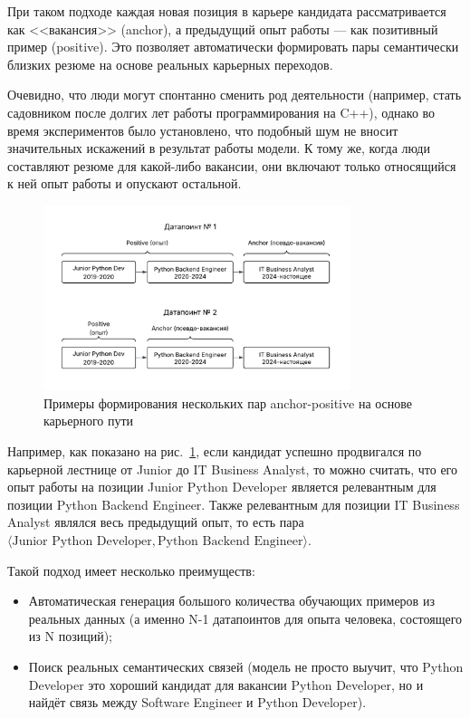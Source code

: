 \documentclass[14pt]{mmcs_article}
\begin{document}
При таком подходе каждая новая позиция в карьере кандидата рассматривается как <<вакансия>> (anchor), а предыдущий опыт работы --- как позитивный пример (positive). Это позволяет автоматически формировать пары семантически близких резюме на основе реальных карьерных переходов.

Очевидно, что люди могут спонтанно сменить род деятельности (например, стать садовником после долгих лет работы программирования на C++), однако во время экспериментов было установлено, что подобный шум не вносит значительных искажений в результат работы модели. К тому же, когда люди составляют резюме для какой-либо вакансии, они включают только относящийся к ней опыт работы и опускают остальной.

\begin{figure}[h]
  \centering
  \includegraphics[width=0.8\textwidth]{plots/career_path_example.pdf}
  \caption{\centering Примеры формирования нескольких пар anchor-positive на основе карьерного пути}
  \label{fig:career_path_example}
\end{figure}

Например, как показано на рис.~\ref{fig:career_path_example}, если кандидат успешно продвигался по карьерной лестнице от Junior до IT Business Analyst, то можно считать, что его опыт работы на позиции Junior Python Developer является релевантным для позиции Python Backend Engineer. Также релевантным для позиции IT Business Analyst являлся весь предыдущий опыт, то есть пара $\langle\text{Junior Python Developer},\text{Python Backend Engineer}\rangle$.

Такой подход имеет несколько преимуществ:
\begin{itemize}
  \item Автоматическая генерация большого количества обучающих примеров из реальных данных (а именно N-1 датапоинтов для опыта человека, состоящего из N позиций);
  \item Поиск реальных семантических связей (модель не просто выучит, что Python Developer это хороший кандидат для вакансии Python Developer, но и найдёт связь между Software Engineer и Python Developer).
\end{itemize}
\end{document}
